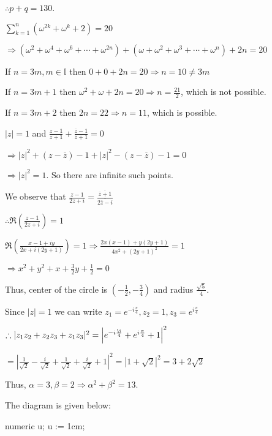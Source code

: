  $\therefore p + q = 130$.
\item $\displaystyle\sum_{k = 1}^n\left(\omega^{2k} + \omega^k + 2\right) = 20$

  $\Rightarrow \left(\omega^2 + \omega^4 + \omega^6 + \cdots + \omega^{2n}\right)  + \left(\omega
  + \omega^2 + \omega^3 + \cdots + \omega^n\right) + 2n = 20$

  If $n = 3m, m\in\mathbb{I}$ then $0 + 0 + 2n = 20 \Rightarrow n = 10\neq 3m$

  If $n = 3m + 1$ then $\omega^2 + \omega + 2n = 20 \Rightarrow n = \frac{21}{2}$, which is not possible.

  If $n = 3m + 2$ then $2n = 22 \Rightarrow n = 11$, which is possible.
\item $|z| = 1$ and $\frac{z - 1}{z + 1} + \frac{\overline{z} - 1}{\overline{z} + 1} = 0$

  $\Rightarrow |z|^2 + \left(z - \overline{z}\right) - 1 + |z|^2 - \left(z - \overline{z}\right) - 1 = 0$

  $\Rightarrow |z|^2 = 1$. So there are infinite such points.
\item We observe that $\frac{z - 1}{2z + i} = \frac{\overline{\overline{z} + 1}}{\overline{2\overline{z} -
    i}}$

  $\therefore \Re\left(\frac{z - 1}{2z + i}\right) = 1$

  $\Re\left(\frac{x - 1 + iy}{2x + i(2y + 1)}\right) = 1 \Rightarrow \frac{2x(x - 1) + y(2y + 1)}{4x^2 + (2y
  + 1)^2} = 1$

  $\Rightarrow x^2 + y^2 + x + \frac{3}{2}y + \frac{1}{2} = 0$

  Thus, center of the circle is $\left(-\frac{1}{2}, -\frac{3}{4}\right)$ and radius $\frac{\sqrt{5}}{4}$.
\item Since $|z| = 1$ we can write $z_1 = e^{-i\frac{\pi}{4}}, z_2 = 1, z_3 = e^{i\frac{\pi}{4}}$

  $\therefore |z_1z_2 + z_2z_3 + z_1z_3|^2 = \left|e^{-i\frac{\i}{4}} + e^{i\frac{\pi}{4}} + 1\right|^2$

  $= \left|\frac{1}{\sqrt{2}} -\frac{i}{\sqrt{2}} + \frac{1}{\sqrt{2}} + \frac{i}{\sqrt{2}} + 1\right|^2 =
  \left|1 + \sqrt{2}\right|^2 = 3 + 2\sqrt{2}$

  Thus, $\alpha = 3, \beta = 2\Rightarrow \alpha^2 + \beta^2 = 13$.
\item The diagram is given below:

  \startplacefigure[location=force]
    \startMPcode
      numeric u;
      u := 1cm;

